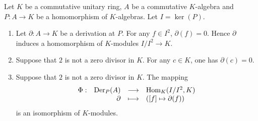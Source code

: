 \begin{propositionenv}
    Let $K$ be a commutative unitary ring, $A$ be a commutative $K$-algebra and $P : A \rightarrow K$ be a homomorphism of $K$-algebras.
    Let $I = \ker(P)$.
    \begin{enumerate}[label=(\arabic*)]
        \item Let $\partial : A \rightarrow K$ be a derivation at $P$.
            For any $f \in I^2$, $\partial(f) = 0$.
            Hence $\partial$ induces a homomorphism of $K$-modules $I/I^2 \rightarrow K$.
        \item  Suppose that $2$ is not a zero divisor in $K$.
            For any $c \in K$, one has $\partial(c) = 0$.
        \item Suppose that $2$ is not a zero divisor in $K$.
            The mapping 
            $$\begin{array}{rrcl}
                \Phi : & \operatorname{\mathrm{Der}}_P(A) & \longrightarrow & \operatorname{\mathrm{Hom}}_K(I/I^2, K)\\
                & \partial & \longmapsto & ([f] \mapsto \partial(f))
            \end{array}$$
            is an isomorphism of $K$-modules.
    \end{enumerate}
\end{propositionenv}
